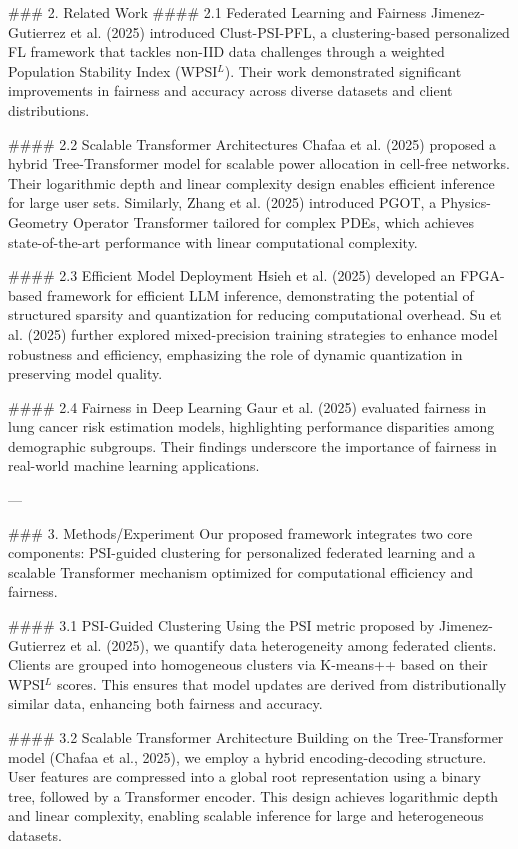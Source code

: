 ### 2. Related Work  
#### 2.1 Federated Learning and Fairness  
Jimenez-Gutierrez et al. (2025) introduced Clust-PSI-PFL, a clustering-based personalized FL framework that tackles non-IID data challenges through a weighted Population Stability Index (WPSI\(^L\)). Their work demonstrated significant improvements in fairness and accuracy across diverse datasets and client distributions.

#### 2.2 Scalable Transformer Architectures  
Chafaa et al. (2025) proposed a hybrid Tree-Transformer model for scalable power allocation in cell-free networks. Their logarithmic depth and linear complexity design enables efficient inference for large user sets. Similarly, Zhang et al. (2025) introduced PGOT, a Physics-Geometry Operator Transformer tailored for complex PDEs, which achieves state-of-the-art performance with linear computational complexity.

#### 2.3 Efficient Model Deployment  
Hsieh et al. (2025) developed an FPGA-based framework for efficient LLM inference, demonstrating the potential of structured sparsity and quantization for reducing computational overhead. Su et al. (2025) further explored mixed-precision training strategies to enhance model robustness and efficiency, emphasizing the role of dynamic quantization in preserving model quality.

#### 2.4 Fairness in Deep Learning  
Gaur et al. (2025) evaluated fairness in lung cancer risk estimation models, highlighting performance disparities among demographic subgroups. Their findings underscore the importance of fairness in real-world machine learning applications.

---

### 3. Methods/Experiment  
Our proposed framework integrates two core components: PSI-guided clustering for personalized federated learning and a scalable Transformer mechanism optimized for computational efficiency and fairness.

#### 3.1 PSI-Guided Clustering  
Using the PSI metric proposed by Jimenez-Gutierrez et al. (2025), we quantify data heterogeneity among federated clients. Clients are grouped into homogeneous clusters via K-means++ based on their WPSI\(^L\) scores. This ensures that model updates are derived from distributionally similar data, enhancing both fairness and accuracy.

#### 3.2 Scalable Transformer Architecture  
Building on the Tree-Transformer model (Chafaa et al., 2025), we employ a hybrid encoding-decoding structure. User features are compressed into a global root representation using a binary tree, followed by a Transformer encoder. This design achieves logarithmic depth and linear complexity, enabling scalable inference for large and heterogeneous datasets.

